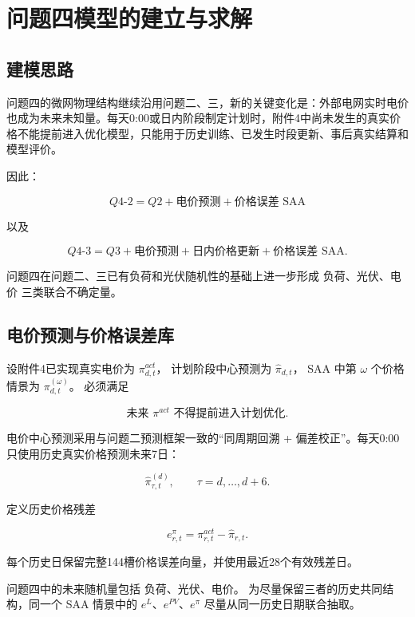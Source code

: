\section{问题四模型的建立与求解}

\subsection{建模思路}

问题四的微网物理结构继续沿用问题二、三，新的关键变化是：外部电网实时电价也成为未来未知量。每天0:00或日内阶段制定计划时，附件4中尚未发生的真实价格不能提前进入优化模型，只能用于历史训练、已发生时段更新、事后真实结算和模型评价。

因此：

\[
\boxed{
Q4\text{-}2
=
Q2
+
\text{电价预测}
+
\text{价格误差 SAA}
}
\]

以及

\[
\boxed{
Q4\text{-}3
=
Q3
+
\text{电价预测}
+
\text{日内价格更新}
+
\text{价格误差 SAA}
}.
\]

问题四在问题二、三已有负荷和光伏随机性的基础上进一步形成 负荷、光伏、电价 三类联合不确定量。

\subsection{电价预测与价格误差库}

设附件4已实现真实电价为 \(\pi^{act}_{d,t}\)， 计划阶段中心预测为 \(\hat\pi_{d,t}\)， SAA 中第 \(\omega\) 个价格情景为 \(\pi^{(\omega)}_{d,t}\)。 必须满足

\begin{equation}
\boxed{
\text{未来 }\pi^{act}\text{ 不得提前进入计划优化}
}.
\end{equation}

电价中心预测采用与问题二预测框架一致的“同周期回溯 + 偏差校正”。每天0:00只使用历史真实价格预测未来7日：

\begin{equation}
\hat\pi_{\tau,t}^{(d)},
\qquad
\tau=d,\ldots,d+6.
\end{equation}

定义历史价格残差

\begin{equation}
e^\pi_{r,t}
=
\pi^{act}_{r,t}
-
\hat\pi_{r,t}.
\end{equation}

每个历史日保留完整144槽价格误差向量，并使用最近28个有效残差日。

问题四中的未来随机量包括 负荷、光伏、电价。 为尽量保留三者的历史共同结构，同一个 SAA 情景中的 \(e^L\)、\(e^{PV}\)、\(e^\pi\) 尽量从同一历史日期联合抽取。

